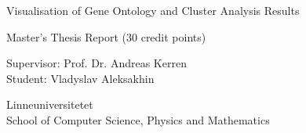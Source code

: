 \begin{titlepage}
\begin{center}

\Huge{Visualisation of Gene Ontology and Cluster Analysis Results}

\vfill

\begin{Large}
Master's Thesis Report (30 credit points)

\vfill

Supervisor: Prof. Dr. Andreas Kerren\\
Student: Vladyslav Aleksakhin

\vfill

Linneuniversitetet\\
School of Computer Science, Physics and Mathematics

\end{Large}


\end{center}
\end{titlepage}
